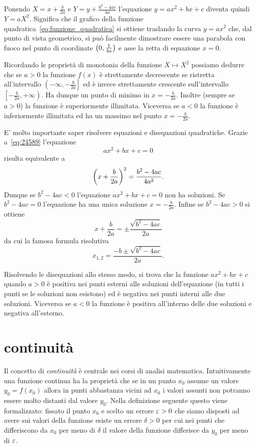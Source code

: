 Ponendo $X=x+\frac b{2a}$ e $Y=y+\frac{b^2-4ac}{4a}$
l'equazione $y=ax^2+bx+c$ diventa quindi $Y=aX^2$. Significa
che il grafico della funzione quadratica~\eqref{eq:funzione_quadratica}
si ottiene traslando la curva $y=a x^2$ che, dal punto di vista
geometrico, si può facilmente
dimostrare essere una parabola con fuoco
nel punto di coordinate ${\left( 0,\frac 1 {4a} \right)}$
e asse la retta di equazione $x=0$.

Ricordando le proprietà di monotonia della funzione $X\mapsto X^2$
possiamo dedurre che se $a>0$ la funzione $f(x)$ è strettamente
decrescente se ristretta all'intervallo $\left(-\infty,-\frac b {2a}\right]$ ed è invece strettamente crescente sull'intervallo $\left[-\frac b{2a},+\infty\right)$. Ha dunque un punto di minimo in $x=-\frac{b}{2a}$.
Inoltre (sempre se $a>0$) la funzione è superiormente illimitata.
Viceversa se $a<0$ la funzione è inferiormente illimitata ed ha un massimo nel punto $x=-\frac{b}{2a}$.

E' molto importante saper risolvere equazioni e disequazioni
quadratiche. Grazie a~\eqref{eq:24589} l'equazione
\[
 a x^2 + bx + c = 0
\]
risulta equivalente a
\[
  {\left( x+\frac{b}{2a} \right)}^2 = \frac{b^2-4ac}{4a^2}.
\]
Dunque se $b^2-4ac<0$ l'equazione $ax^2+bx+c=0$ non ha soluzioni.
Se $b^2-4ac=0$ l'equazione ha una unica soluzione $x=-\frac{b}{2a}$.
Infine se $b^2-4ac>0$ si ottiene
\[
  x+\frac b{2a} = \pm \frac{\sqrt{b^2-4ac}}{2a}
\]
da cui la famosa formula risolutiva
\mymark{***}
\[
  x_{1,2} = \frac{-b \pm \sqrt{b^2-4ac}}{2a}.
\]

Risolvendo le disequazioni allo stesso modo, si trova
che la funzione $ax^2+bx+c$ quando $a>0$ è positiva
nei punti esterni alle soluzioni dell'equazione
(in tutti i punti se le soluzioni non esistono) ed
è negativa nei punti interni alle due soluzioni.
Viceversa se $a<0$ la funzione è positiva all'interno
delle due soluzioni e negativa all'esterno.

\section{continuità}

Il concetto di \emph{continuità} è centrale
nei corsi di analisi matematica.
Intuitivamente una funzione continua ha la proprietà
che se in un punto $x_0$ assume un valore $y_0=f(x_0)$ allora
in punti abbastanza vicini ad $x_0$ i valori assunti
non potranno essere molto distanti dal valore $y_0$.
Nella definizione seguente questo viene formalizzato:
fissato il punto $x_0$ e scelto un errore $\varepsilon>0$
che siamo disposti ad avere sui valori della funzione
esiste un errore $\delta>0$ per cui nei punti
che differiscono da $x_0$ per meno di $\delta$ il valore
della funzione differisce da $y_0$ per meno di $\varepsilon$.


